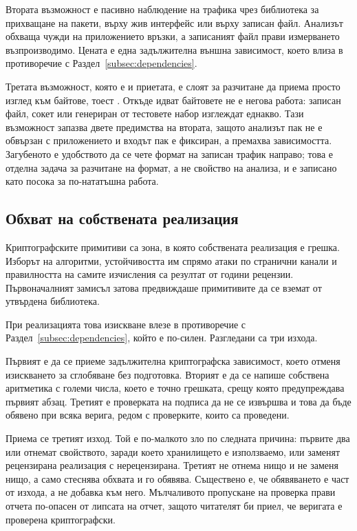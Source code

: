Втората възможност е пасивно наблюдение на трафика чрез библиотека за прихващане на пакети,
върху жив интерфейс или върху записан файл. Анализът обхваща чужди на приложението връзки,
а записаният файл прави измерването възпроизводимо. Цената е една задължителна външна
зависимост, което влиза в противоречие с Раздел~\ref{subsec:dependencies}.

Третата възможност, която е и приетата, е слоят за разчитане да приема просто изглед към
байтове, тоест . Откъде идват байтовете не е негова
работа: записан файл, сокет или генериран от тестовете набор изглеждат еднакво. Тази
възможност запазва двете предимства на втората, защото анализът пак не е обвързан с
приложението и входът пак е фиксиран, а премахва зависимостта. Загубеното е удобството да
се чете формат на записан трафик направо; това е отделна задача за разчитане на формат, а
не свойство на анализа, и е записано като посока за по-нататъшна работа.

\subsection{Обхват на собствената реализация}
\label{subsec:scope}

Криптографските примитиви са зона, в която собствената реализация е грешка. Изборът на
алгоритми, устойчивостта им спрямо атаки по странични канали и правилността на самите
изчисления са резултат от години рецензии. Първоначалният замисъл затова предвиждаше
примитивите да се вземат от утвърдена библиотека.

При реализацията това изискване влезе в противоречие с
Раздел~\ref{subsec:dependencies}, който е по-силен. Разгледани са три изхода.

Първият е да се приеме задължителна криптографска зависимост, което отменя изискването за
сглобяване без подготовка. Вторият е да се напише собствена аритметика с големи числа, което
е точно грешката, срещу която предупреждава първият абзац. Третият е проверката на подписа
да не се извършва и това да бъде обявено при всяка верига, редом с проверките, които са
проведени.

Приема се третият изход. Той е по-малкото зло по следната причина: първите два или отнемат
свойството, заради което хранилището е използваемо, или заменят рецензирана реализация с
нерецензирана. Третият не отнема нищо и не заменя нищо, а само стеснява обхвата и го
обявява. Съществено е, че обявяването е част от изхода, а не добавка към него. Мълчаливото
пропускане на проверка прави отчета по-опасен от липсата на отчет, защото читателят би
приел, че веригата е проверена криптографски.

